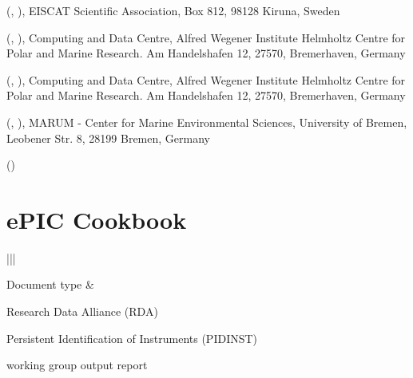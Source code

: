 \documentclass[a4paper,10pt,english]{sphinxmanual}
\begin{document}
 (, ),
EISCAT Scientific Association, Box 812, 98128 Kiruna, Sweden

 (, ),
Computing and Data Centre, Alfred Wegener Institute Helmholtz Centre for
Polar and Marine Research. Am Handelshafen 12, 27570, Bremerhaven,
Germany

 (, ),
Computing and Data Centre, Alfred Wegener Institute Helmholtz Centre for
Polar and Marine Research. Am Handelshafen 12, 27570, Bremerhaven,
Germany

 (, ),
MARUM - Center for Marine Environmental Sciences, University of Bremen, Leobener Str. 8, 28199 Bremen, Germany

 ()


\chapter{ePIC Cookbook}
\label{\detokenize{cookbook/index:epic-cookbook}}\label{\detokenize{cookbook/index:id1}}\label{\detokenize{cookbook/index::doc}}

\begin{savenotes}\sphinxattablestart
\centering
\begin{tabular}[t]{|*{2}{|}}
\hline

Document type
&
\begin{DUlineblock}{0em}
\item[] Research Data Alliance (RDA)
\item[] Persistent Identification of Instruments (PIDINST)
\item[] working group output report
\end{DUlineblock}
\\
\hline
\end{tabular}
\par
\sphinxattableend\end{savenotes}
\end{document}
